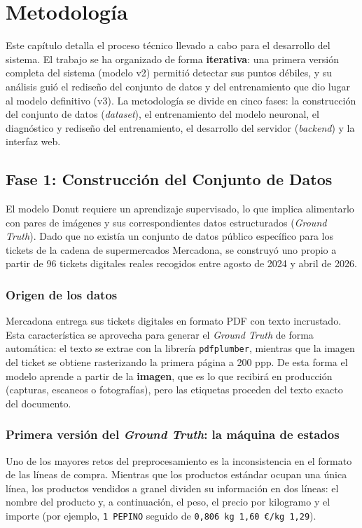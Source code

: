 \chapter{Metodología}
\label{ch:metodologia}

Este capítulo detalla el proceso técnico llevado a cabo para el desarrollo del sistema. El trabajo se ha organizado de forma \textbf{iterativa}: una primera versión completa del sistema (modelo v2) permitió detectar sus puntos débiles, y su análisis guió el rediseño del conjunto de datos y del entrenamiento que dio lugar al modelo definitivo (v3). La metodología se divide en cinco fases: la construcción del conjunto de datos (\textit{dataset}), el entrenamiento del modelo neuronal, el diagnóstico y rediseño del entrenamiento, el desarrollo del servidor (\textit{backend}) y la interfaz web.

\section{Fase 1: Construcción del Conjunto de Datos}
\label{s:dataset}
El modelo Donut requiere un aprendizaje supervisado, lo que implica alimentarlo con pares de imágenes y sus correspondientes datos estructurados (\textit{Ground Truth}). Dado que no existía un conjunto de datos público específico para los tickets de la cadena de supermercados Mercadona, se construyó uno propio a partir de 96 tickets digitales reales recogidos entre agosto de 2024 y abril de 2026.

\subsection{Origen de los datos}
Mercadona entrega sus tickets digitales en formato PDF con texto incrustado. Esta característica se aprovecha para generar el \textit{Ground Truth} de forma automática: el texto se extrae con la librería \texttt{pdfplumber}, mientras que la imagen del ticket se obtiene rasterizando la primera página a 200 ppp. De esta forma el modelo aprende a partir de la \textbf{imagen}, que es lo que recibirá en producción (capturas, escaneos o fotografías), pero las etiquetas proceden del texto exacto del documento.

\subsection{Primera versión del \textit{Ground Truth}: la máquina de estados}
Uno de los mayores retos del preprocesamiento es la inconsistencia en el formato de las líneas de compra. Mientras que los productos estándar ocupan una única línea, los productos vendidos a granel dividen su información en dos líneas: el nombre del producto y, a continuación, el peso, el precio por kilogramo y el importe (por ejemplo, \texttt{1 PEPINO} seguido de \texttt{0,806 kg 1,60 €/kg 1,29}).

